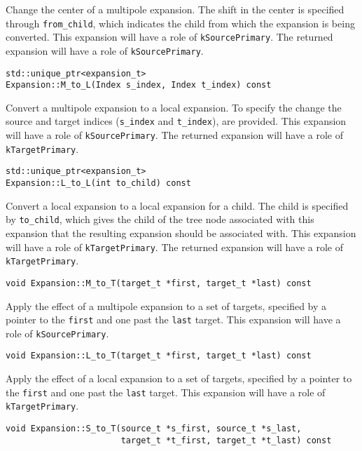 \noindent Change the center of a multipole expansion. The shift in the center
is specified through \texttt{from\_child}, which indicates the child from which
the expansion is being converted.
This expansion will have a role of \texttt{kSourcePrimary}.
The returned expansion will have a role of \texttt{kSourcePrimary}.

\begin{lstlisting}
std::unique_ptr<expansion_t>
Expansion::M_to_L(Index s_index, Index t_index) const
\end{lstlisting}

\noindent Convert a multipole expansion to a local expansion. To specify the
change the source and target indices (\texttt{s\_index} and \texttt{t\_index}),
are provided.
This expansion will have a role of \texttt{kSourcePrimary}.
The returned expansion will have a role of \texttt{kTargetPrimary}.

\begin{lstlisting}
std::unique_ptr<expansion_t>
Expansion::L_to_L(int to_child) const
\end{lstlisting}

\noindent Convert a local expansion to a local expansion for a child. The
child is specified by \texttt{to\_child}, which gives the child of the tree
node associated with this expansion that the resulting expansion should be
associated with.
This expansion will have a role of \texttt{kTargetPrimary}.
The returned expansion will have a role of \texttt{kTargetPrimary}.

\begin{lstlisting}
void Expansion::M_to_T(target_t *first, target_t *last) const
\end{lstlisting}

\noindent Apply the effect of a multipole expansion to a set of targets,
specified by a pointer to the \texttt{first} and one past the \texttt{last}
target.
This expansion will have a role of \texttt{kSourcePrimary}.

\begin{lstlisting}
void Expansion::L_to_T(target_t *first, target_t *last) const
\end{lstlisting}

\noindent Apply the effect of a local expansion to a set of targets, specified
by a pointer to the \texttt{first} and one past the \texttt{last} target.
This expansion will have a role of \texttt{kTargetPrimary}.

\begin{lstlisting}
void Expansion::S_to_T(source_t *s_first, source_t *s_last,
                       target_t *t_first, target_t *t_last) const
\end{lstlisting}


